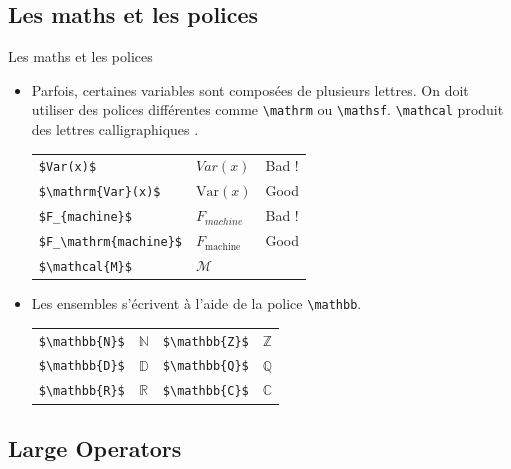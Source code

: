 \subsection{Les maths et les polices}

\begin{frame}[fragile]{Les maths et les polices}
  \begin{itemize}
    \item Parfois, certaines variables sont composées de plusieurs lettres. On doit utiliser des polices différentes comme \lstinline|\mathrm| ou \lstinline|\mathsf|. \lstinline|\mathcal| produit des lettres \og calligraphiques \fg{}.
      \begin{center}
        \begin{tabular}{lll}
                  \lstinline|$Var(x)$| & $Var(x)$ & Bad ! \\
                  \lstinline|$\mathrm{Var}(x)$| & $\mathrm{Var}(x)$ & Good \\
                  \lstinline|$F_{machine}$| & $F_{machine}$ & Bad ! \\
                  \lstinline|$F_\mathrm{machine}$| & $F_\mathrm{machine}$ & Good \\
                  \lstinline|$\mathcal{M}$| & $\mathcal{M}$ &
        \end{tabular}
      \end{center}
    \item Les ensembles s'écrivent à l'aide de la police \lstinline|\mathbb|.
      \begin{center}
          \begin{tabular}{cccc}
          \lstinline|$\mathbb{N}$| & $\mathbb{N}$ & \lstinline|$\mathbb{Z}$| & $\mathbb{Z}$ \\
          \lstinline|$\mathbb{D}$| & $\mathbb{D}$ & \lstinline|$\mathbb{Q}$| & $\mathbb{Q}$ \\
          \lstinline|$\mathbb{R}$| & $\mathbb{R}$ & \lstinline|$\mathbb{C}$| & $\mathbb{C}$
          \end{tabular}
      \end{center}
  \end{itemize}
\end{frame}

\subsection{Large Operators}

